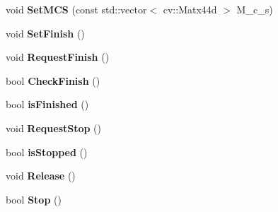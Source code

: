 \begin{DoxyCompactItemize}
\item 
void {\bfseries Set\+M\+CS} (const std\+::vector$<$ cv\+::\+Matx44d $>$ M\+\_\+c\+\_\+s)\hypertarget{classMultiColSLAM_1_1cMapPublisher_afc5535e79e8df23da397bee4f67bce58}{}\label{classMultiColSLAM_1_1cMapPublisher_afc5535e79e8df23da397bee4f67bce58}

\item 
void {\bfseries Set\+Finish} ()\hypertarget{classMultiColSLAM_1_1cMapPublisher_a22951ebc491cde2577a53dfb7f963633}{}\label{classMultiColSLAM_1_1cMapPublisher_a22951ebc491cde2577a53dfb7f963633}

\item 
void {\bfseries Request\+Finish} ()\hypertarget{classMultiColSLAM_1_1cMapPublisher_aecee53884855f3682b34c463bad83bf7}{}\label{classMultiColSLAM_1_1cMapPublisher_aecee53884855f3682b34c463bad83bf7}

\item 
bool {\bfseries Check\+Finish} ()\hypertarget{classMultiColSLAM_1_1cMapPublisher_afaec0b563b6d15c9da6e376e37c51beb}{}\label{classMultiColSLAM_1_1cMapPublisher_afaec0b563b6d15c9da6e376e37c51beb}

\item 
bool {\bfseries is\+Finished} ()\hypertarget{classMultiColSLAM_1_1cMapPublisher_afaec25a0b20dcfef5200d5bf60df1ae2}{}\label{classMultiColSLAM_1_1cMapPublisher_afaec25a0b20dcfef5200d5bf60df1ae2}

\item 
void {\bfseries Request\+Stop} ()\hypertarget{classMultiColSLAM_1_1cMapPublisher_a167d2efa70eb345381ffaf325e417496}{}\label{classMultiColSLAM_1_1cMapPublisher_a167d2efa70eb345381ffaf325e417496}

\item 
bool {\bfseries is\+Stopped} ()\hypertarget{classMultiColSLAM_1_1cMapPublisher_a3b7afcdca71d1d495b3b03c660279805}{}\label{classMultiColSLAM_1_1cMapPublisher_a3b7afcdca71d1d495b3b03c660279805}

\item 
void {\bfseries Release} ()\hypertarget{classMultiColSLAM_1_1cMapPublisher_abd0a7081152790a02797dc22e4625730}{}\label{classMultiColSLAM_1_1cMapPublisher_abd0a7081152790a02797dc22e4625730}

\item 
bool {\bfseries Stop} ()\hypertarget{classMultiColSLAM_1_1cMapPublisher_acff2e9b01cc77a3e44655c348cfbe377}{}\label{classMultiColSLAM_1_1cMapPublisher_acff2e9b01cc77a3e44655c348cfbe377}

\end{DoxyCompactItemize}
